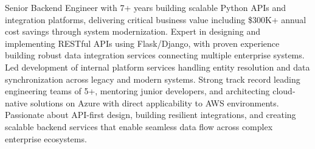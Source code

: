 
\begin{cvparagraph}
Senior Backend Engineer with 7+ years building scalable Python APIs and integration platforms, delivering critical business value including \$300K+ annual cost savings through system modernization. Expert in designing and implementing RESTful APIs using Flask/Django, with proven experience building robust data integration services connecting multiple enterprise systems. Led development of internal platform services handling entity resolution and data synchronization across legacy and modern systems. Strong track record leading engineering teams of 5+, mentoring junior developers, and architecting cloud-native solutions on Azure with direct applicability to AWS environments. Passionate about API-first design, building resilient integrations, and creating scalable backend services that enable seamless data flow across complex enterprise ecosystems.
\end{cvparagraph}